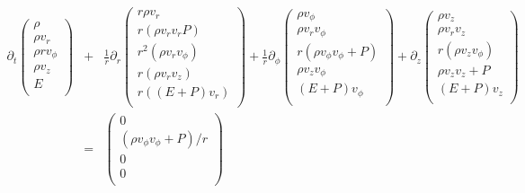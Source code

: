 \documentclass[landscape]{article}
\begin{document}
\begin{eqnarray*}
  \partial_t  \left(
  \begin{array}{c}
    \rho\\
    \rho v_r\\
    \rho r v_{\phi}\\
    \rho v_z\\
    E\\
  \end{array}
  \right) 
  &+& \frac{1}{r} \partial_r \left(
  \begin{array}{c}
    r \rho v_r\\
    r (\rho v_r v_r  P)\\
    r^2 (\rho v_r v_{\phi} )\\
    r (\rho v_r v_z )\\
    r((E+P)v_r)\\
    \end{array}
  \right) + \frac{1}{r} \partial_{\phi} \left(
    \begin{array}{c}
      \rho v_{\phi}\\
      \rho v_r v_{\phi}\\
      r(\rho v_{\phi} v_{\phi}  + P )\\
      \rho v_z v_{\phi} \\
      (E+P)v_{\phi}\\
    \end{array}
    \right)+ \partial_z \left(
    \begin{array}{c}
      \rho v_z\\
      \rho v_r v_z \\
      r(\rho v_z v_{\phi} )\\
      \rho v_z v_z + P\\
      (E+P)v_z\\
    \end{array}
    \right)\\
    &=&\left(
    \begin{array}{c}
      0\\
      (\rho v_{\phi} v_{\phi}+P)/r\\
      0\\
      0\\
    \end{array}
    \right)
\end{eqnarray*}
\end{document}
